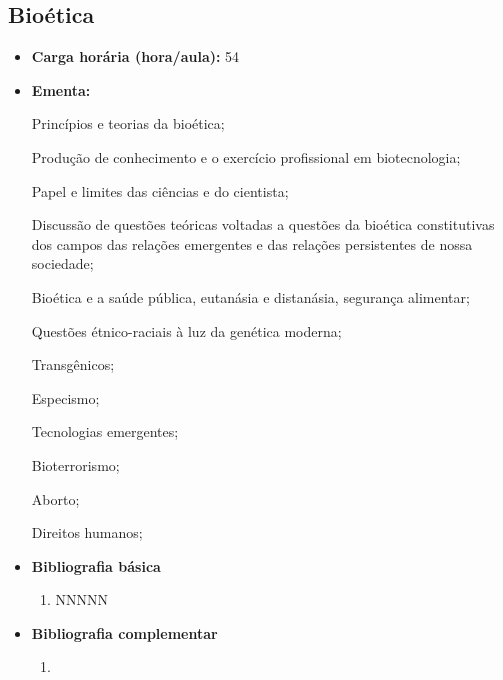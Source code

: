\documentclass[11pt,fleqn]{book} %
\begin{document}
\subsection{Bioética}\label{disc:bioetica}
\begin{itemize}
	\item \textbf{Carga horária (hora/aula):} 54
	\item \textbf{Ementa:} 
	
	Princípios e teorias da bioética;
	
	Produção de conhecimento e o exercício profissional em biotecnologia; 
	
	Papel e limites das ciências e do cientista; 
	
	Discussão de questões teóricas voltadas a questões da bioética constitutivas dos campos das relações emergentes e das relações persistentes de nossa sociedade; 
	
	Bioética e a saúde pública, eutanásia e distanásia, segurança alimentar; 
	
	Questões étnico-raciais à luz da genética moderna;
	
	Transgênicos; 
	
	Especismo; 
	
	Tecnologias emergentes;
	
	Bioterrorismo; 
	
	Aborto;
	
	Direitos humanos;
	\item \textbf{Bibliografia básica}
	\begin{enumerate}
		\item NNNNN
	\end{enumerate}
	\item \textbf{Bibliografia complementar}
	\begin{enumerate}
		\item 
	\end{enumerate}	
\end{itemize}

\newpage
\end{document}
